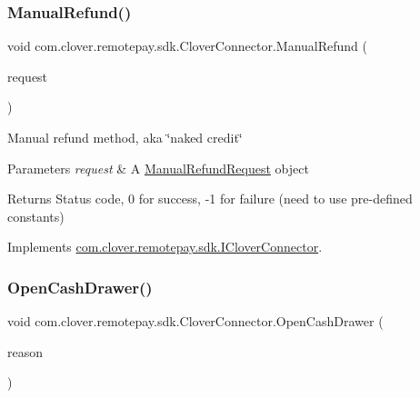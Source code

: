 \subsubsection{\texorpdfstring{Manual\+Refund()}{ManualRefund()}}
{\footnotesize\ttfamily void com.\+clover.\+remotepay.\+sdk.\+Clover\+Connector.\+Manual\+Refund (\begin{DoxyParamCaption}\item[{\hyperlink{classcom_1_1clover_1_1remotepay_1_1sdk_1_1_manual_refund_request}{Manual\+Refund\+Request}}]{request }\end{DoxyParamCaption})}



Manual refund method, aka \char`\"{}naked credit\char`\"{} 


\begin{DoxyParams}{Parameters}
{\em request} & A \hyperlink{classcom_1_1clover_1_1remotepay_1_1sdk_1_1_manual_refund_request}{Manual\+Refund\+Request} object\\
\hline
\end{DoxyParams}
\begin{DoxyReturn}{Returns}
Status code, 0 for success, -\/1 for failure (need to use pre-\/defined constants)
\end{DoxyReturn}


Implements \hyperlink{interfacecom_1_1clover_1_1remotepay_1_1sdk_1_1_i_clover_connector_a0216263a8b560a29f9c64778e37a136e}{com.\+clover.\+remotepay.\+sdk.\+I\+Clover\+Connector}.

\mbox{\label{classcom_1_1clover_1_1remotepay_1_1sdk_1_1_clover_connector_aeeba2f27e901c6f105dbd9cdc624bd2c}} 
\subsubsection{\texorpdfstring{Open\+Cash\+Drawer()}{OpenCashDrawer()}}
{\footnotesize\ttfamily void com.\+clover.\+remotepay.\+sdk.\+Clover\+Connector.\+Open\+Cash\+Drawer (\begin{DoxyParamCaption}\item[{String}]{reason }\end{DoxyParamCaption})}



